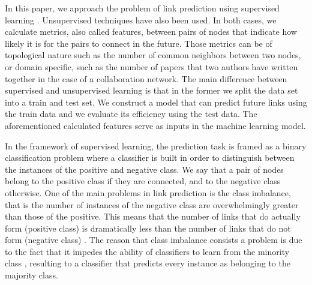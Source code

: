 \documentclass{acm_proc_article-sp}
\begin{document}
In this paper, we approach the problem of link prediction using supervised learning \cite{Fire2013, Hasan06linkprediction, Lichtenwalter:2010:NPM:1835804.1835837, Wang:2007:LPM:1441428.1442084}. Unsupervised techniques have also been used. In both cases, we calculate metrics, also called features, between pairs of nodes that indicate how likely it is for the pairs to connect in the future. Those metrics can be of topological nature such as the number of common neighbors between two nodes, or domain specific, such as the number of papers that two authors have written together in the case of a collaboration network. The main difference between supervised and unsupervised learning is that in the former we split the data set into a train and test set. We construct a model that can predict future links using the train data and we evaluate its efficiency using the test data. The aforementioned calculated features serve as inputs in the machine learning model.





In the framework of supervised learning, the prediction task is framed as a binary classification problem where a classifier is built in order to distinguish between the instances of the positive and negative class. We say that a pair of nodes belong to the positive class if they are connected, and to the negative class otherwise. One of the main problems in link prediction is the class imbalance, that is the number of instances of the negative class are overwhelmingly greater than those of the positive. This means that the number of links that do actually form (positive class) is dramatically less than the number of links that do not form (negative class) \cite{Lichtenwalter:2010:NPM:1835804.1835837}. The reason that class imbalance consists a problem is due to the fact that it impedes the ability of classifiers to learn from the minority class \cite{Cieslak2012}, resulting to a classifier that predicts every instance as belonging to the majority class. 
 
\end{document}
